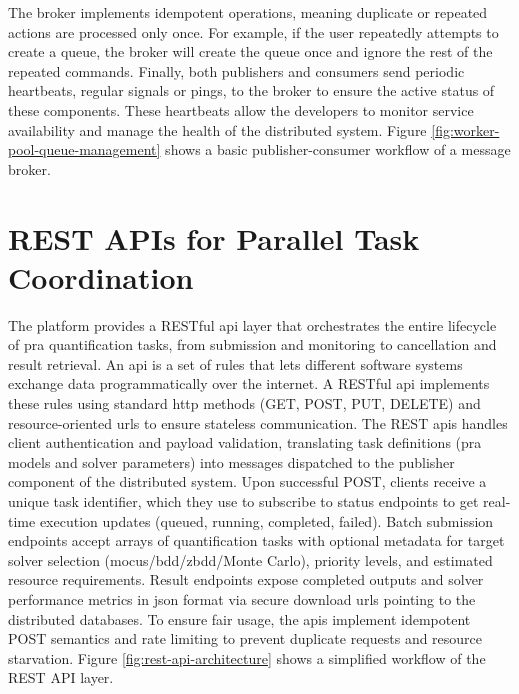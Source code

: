 The broker implements idempotent operations, meaning duplicate or repeated actions are processed only once. For example, if the user repeatedly attempts to create a queue, the broker will create the queue once and ignore the rest of the repeated commands. Finally, both publishers and consumers send periodic heartbeats, regular signals or pings, to the broker to ensure the active status of these components. These heartbeats allow the developers to monitor service availability and manage the health of the distributed system. Figure \ref{fig:worker-pool-queue-management} shows a basic publisher-consumer workflow of a message broker.



\section{REST APIs for Parallel Task Coordination}

The platform provides a RESTful \acrshort{api} layer that orchestrates the entire lifecycle of \acrshort{pra} quantification tasks, from submission and monitoring to cancellation and result retrieval. An \acrshort{api} is a set of rules that lets different software systems exchange data programmatically over the internet. A RESTful \acrshort{api} implements these rules using standard \acrshort{http} methods (GET, POST, PUT, DELETE) and resource-oriented \acrshort{url}s to ensure stateless communication. The REST \acrshort{api}s handles client authentication and payload validation, translating task definitions (\acrshort{pra} models and solver parameters) into messages dispatched to the publisher component of the distributed system. Upon successful POST, clients receive a unique task identifier, which they use to subscribe to status endpoints to get real-time execution updates (queued, running, completed, failed). Batch submission endpoints accept arrays of quantification tasks with optional metadata for target solver selection (\acrshort{mocus}/\acrshort{bdd}/\acrshort{zbdd}/Monte Carlo), priority levels, and estimated resource requirements. Result endpoints expose completed outputs and solver performance metrics in \acrshort{json} format via secure download \acrshort{url}s pointing to the distributed databases. To ensure fair usage, the \acrshort{api}s implement idempotent POST semantics and rate limiting to prevent duplicate requests and resource starvation. Figure \ref{fig:rest-api-architecture} shows a simplified workflow of the REST API layer.

